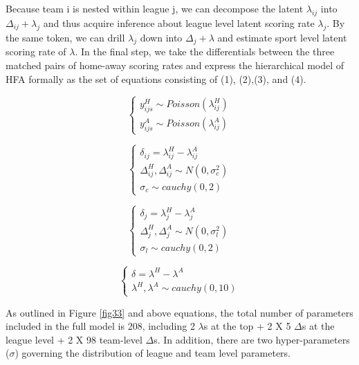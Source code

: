 \documentclass[USenglish]{article}
\begin{document}
Because team i is nested within league j, we can decompose the latent $\lambda_{ij}$ into $\Delta_{ij}+\lambda_j$ and thus acquire inference about league level latent scoring rate $\lambda_j$. By the same token, we can drill $\lambda_j$ down into $\Delta_{j}+\lambda$ and estimate sport level latent scoring rate of $\lambda$. In the final step, we take the differentials between the three matched pairs of home-away scoring rates and express the hierarchical model of HFA formally as the set of equations consisting of (1), (2),(3), and (4). 

\begin{equation}
\begin{cases}
y^H_{ijs} \sim Poisson(\lambda^H_{ij})\\
y^A_{ijs} \sim Poisson(\lambda^A_{ij})
\end{cases}
\end{equation}

\begin{equation}
\begin{cases}
\delta_{ij} = \lambda^H_{ij} - \lambda^A_{ij}\\  
\Delta^H_{ij}, \Delta^A_{ij}  \sim N(0, \sigma^2_c)\\  
\sigma_c \sim cauchy(0,2)
\end{cases}
\end{equation} 

\begin{equation}
\begin{cases}
\delta_{j} = \lambda^H_{j} - \lambda^A_{j}\\  
\Delta^H_{j}, \Delta^A_{j} \sim N(0, \sigma^2_l)\\
\sigma_l \sim cauchy(0,2)
\end{cases}
\end{equation} 

\begin{equation}
\begin{cases}
\delta = \lambda^H - \lambda^A\\
\lambda^H, \lambda^A \sim cauchy(0, 10)
\end{cases}
\end{equation} 

As outlined in Figure \ref{fig33} and above equations, the total number of parameters included in the full model is 208, including 2 $\lambda$s at the top + 2 X 5 $\Delta$s at the league level + 2 X 98 team-level $\Delta$s. In addition, there are two hyper-parameters ($\sigma$) governing the distribution of league and team level parameters.
\end{document}
